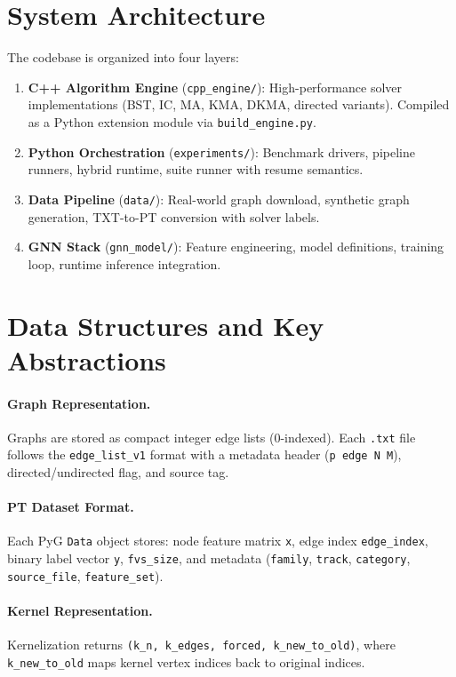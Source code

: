 \documentclass[10pt,a4paper]{report}
\theoremstyle{definition}
\begin{document}
\section{System Architecture}

The codebase is organized into four layers:

\begin{enumerate}
	\item \textbf{C++ Algorithm Engine} (\texttt{cpp\_engine/}): High-performance solver implementations (BST, IC, MA, KMA, DKMA, directed variants). Compiled as a Python extension module via \texttt{build\_engine.py}.
	\item \textbf{Python Orchestration} (\texttt{experiments/}): Benchmark drivers, pipeline runners, hybrid runtime, suite runner with resume semantics.
	\item \textbf{Data Pipeline} (\texttt{data/}): Real-world graph download, synthetic graph generation, TXT-to-PT conversion with solver labels.
	\item \textbf{GNN Stack} (\texttt{gnn\_model/}): Feature engineering, model definitions, training loop, runtime inference integration.
\end{enumerate}

\section{Data Structures and Key Abstractions}

\paragraph{Graph Representation.} Graphs are stored as compact integer edge lists (0-indexed). Each \texttt{.txt} file follows the \texttt{edge\_list\_v1} format with a metadata header (\texttt{p edge N M}), directed/undirected flag, and source tag.

\paragraph{PT Dataset Format.} Each PyG \texttt{Data} object stores: node feature matrix \texttt{x}, edge index \texttt{edge\_index}, binary label vector \texttt{y}, \texttt{fvs\_size}, and metadata (\texttt{family}, \texttt{track}, \texttt{category}, \texttt{source\_file}, \texttt{feature\_set}).

\paragraph{Kernel Representation.} Kernelization returns \texttt{(k\_n, k\_edges, forced, k\_new\_to\_old)}, where \texttt{k\_new\_to\_old} maps kernel vertex indices back to original indices.
\end{document}
